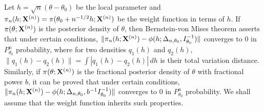 \documentclass[11pt]{article}
\theoremstyle{plain}
\theoremstyle{definition}
\theoremstyle{remark}
\begin{document}
Let $h=\sqrt{n}(\theta-\theta_0)$ be the local parameter and $\pi_n(h;\mathbf{X}^{(n)})=\pi(\theta_0+n^{-1/2}h;\mathbf{X}^{(n)})$ be the weight function in terms of $h$.
If $\pi(\theta;\mathbf{X}^{(n)})$ is the posterior density of $\theta$, then Bernstein-von Mises theorem asserts that under certain conditions,
$
            \|\pi_n(h;\mathbf{X}^{(n)})-\phi(h;\Delta_{n,\theta_0},I_{\theta_0}^{-1})\|
$
converges to $0$ in $P_{\theta_0}^n$ probability,
where for two densities $q_1(h)$ and $q_2(h)$, $\|q_1(h)-q_2(h)\|=\int |q_1(h)-q_2(h)|\, dh$ is their total variation distance.
Similarly, if $\pi(\theta;\mathbf{X}^{(n)})$ is the fractional posterior density of $\theta$ with fractional power $b$, it can be proved that under certain conditions,
$
\|\pi_n(h;\mathbf{X}^{(n)})-\phi(h;\Delta_{n,\theta_0},b^{-1} I_{\theta_0}^{-1})\|
$
converges to $0$ in $P_{\theta_0}^n$ probability.
We shall assume that the weight function inherits such properties.
        
\end{document}
